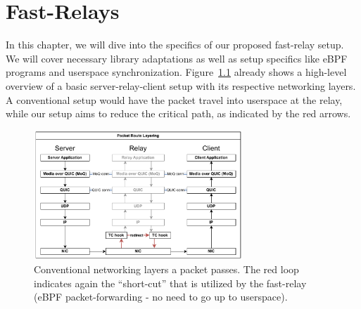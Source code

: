 
\chapter{Fast-Relays}\label{chap:fast_relays}

In this chapter, we will dive into the specifics of our proposed fast-relay setup.
We will cover necessary library adaptations as well as setup specifics like eBPF programs 
and userspace synchronization.
Figure~\ref{fig:route-layering} already shows a high-level overview of a basic 
server-relay-client setup with its respective networking layers.
A conventional setup would have the packet travel into userspace at the relay, 
while our setup aims to reduce the critical path, as indicated by the red arrows.

\vspace{0.5cm}
\begin{figure}[htbp] %
    \centering
    \includegraphics[width=0.7\textwidth]{figures/03_fast_relays/route-layering.drawio.pdf}
    \caption[Packet path schematic regarding network stack]{Conventional networking layers a packet passes.
    The red loop indicates again the ``short-cut'' that is utilized by the fast-relay 
    (eBPF packet-forwarding {-} no need to go up to userspace).}\label{fig:route-layering}
\end{figure}








